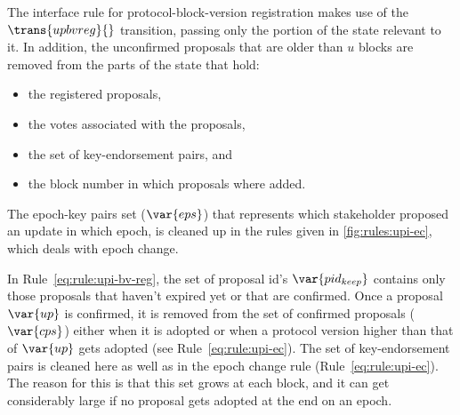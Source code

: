 \clearpage

The interface rule for protocol-block-version registration makes use of the
$\trans{upbvreg}{}$ transition, passing only the portion of the state relevant
to it. In addition, the unconfirmed proposals that are older than $u$ blocks
are removed from the parts of the state that hold:
\begin{itemize}
\item the registered proposals,
\item the votes associated with the proposals,
\item the set of key-endorsement pairs, and
\item the block number in which proposals where added.
\end{itemize}
The epoch-key pairs set ($\var{eps}$) that represents which stakeholder
proposed an update in which epoch, is cleaned up in the rules given in
\cref{fig:rules:upi-ec}, which deals with epoch change.

In Rule~\ref{eq:rule:upi-bv-reg}, the set of proposal id's $\var{pid_{keep}}$
contains only those proposals that haven't expired yet or that are confirmed.
Once a proposal $\var{up}$ is confirmed, it is removed from the set of
confirmed proposals ($\var{cps}$) either when it is adopted or when a protocol
version higher than that of $\var{up}$ gets adopted (see
Rule~\ref{eq:rule:upi-ec}).
%
The set of key-endorsement pairs is cleaned here as well as in the epoch change
rule (Rule~\ref{eq:rule:upi-ec}). The reason for this is that this set grows at
each block, and it can get considerably large if no proposal gets adopted at
the end on an epoch.



